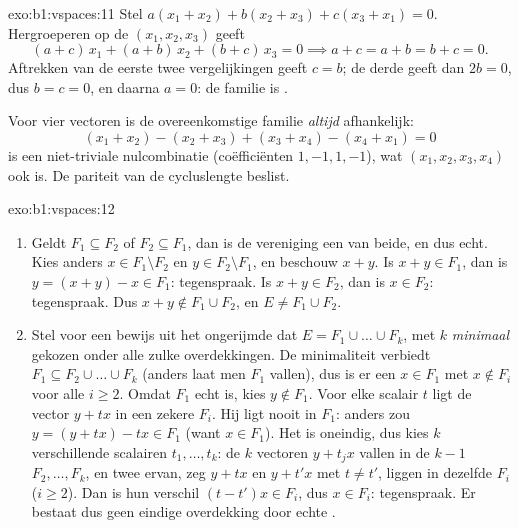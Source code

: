 \begin{solution}{exo:b1:vspaces:11}
Stel $a(x_1 + x_2) + b(x_2 + x_3) + c(x_3 + x_1) = 0$. Hergroeperen
op de  $(x_1, x_2, x_3)$ geeft
\[
(a + c)\,x_1 + (a + b)\,x_2 + (b + c)\,x_3 = 0
\implies a + c = a + b = b + c = 0 .
\]
Aftrekken van de eerste twee vergelijkingen geeft $c = b$; de derde
geeft dan $2b = 0$, dus $b = c = 0$, en daarna $a = 0$: de familie
is .

Voor vier vectoren is de overeenkomstige familie \emph{altijd}
afhankelijk:
\[
(x_1 + x_2) - (x_2 + x_3) + (x_3 + x_4) - (x_4 + x_1) = 0
\]
is een niet-triviale nulcombinatie (coëfficiënten $1, -1, 1, -1$),
wat $(x_1, x_2, x_3, x_4)$ ook is. De pariteit van de cycluslengte
beslist.
\end{solution}

\begin{solution}{exo:b1:vspaces:12}
\begin{enumerate}
  \item Geldt $F_1 \subseteq F_2$ of $F_2 \subseteq F_1$, dan is de
        vereniging een van beide, en dus echt. Kies anders $x \in
        F_1 \setminus F_2$ en $y \in F_2 \setminus F_1$, en
        beschouw $x + y$. Is $x + y \in F_1$, dan is $y = (x + y) -
        x \in F_1$: tegenspraak. Is $x + y \in F_2$, dan is $x \in
        F_2$: tegenspraak. Dus $x + y \notin F_1 \cup F_2$, en $E
        \neq F_1 \cup F_2$.
  \item Stel voor een bewijs uit het ongerijmde dat $E = F_1 \cup
        \dots \cup F_k$, met $k$ \emph{minimaal} gekozen onder alle
        zulke overdekkingen. De minimaliteit verbiedt $F_1
        \subseteq F_2 \cup \dots \cup F_k$ (anders laat men $F_1$
        vallen), dus is er een $x \in F_1$ met $x \notin F_i$ voor
        alle $i \geq 2$. Omdat $F_1$ echt is, kies $y \notin F_1$.
        Voor elke scalair $t$ ligt de vector $y + t x$ in een
        zekere $F_i$. Hij ligt nooit in $F_1$: anders zou $y = (y +
        tx) - tx \in F_1$ (want $x \in F_1$). Het  is
        oneindig, dus kies $k$ verschillende scalairen $t_1, \dots,
        t_k$: de $k$ vectoren $y + t_j x$ vallen in de $k - 1$
         $F_2, \dots, F_k$, en twee ervan, zeg $y + t x$
        en $y + t' x$ met $t \neq t'$, liggen in dezelfde $F_i$ ($i
        \geq 2$). Dan is hun verschil $(t - t')x \in F_i$, dus $x
        \in F_i$: tegenspraak. Er bestaat dus geen eindige
        overdekking door echte .
\end{enumerate}
\end{solution}

